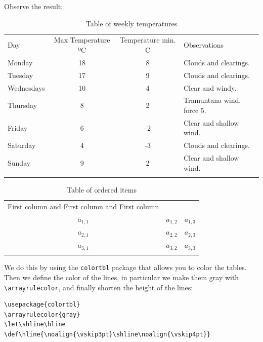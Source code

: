 \documentclass[a4paper,
                             twoside,
                             BCOR=1.0cm,
                             DIV=11,
                             parskip=full,
                             11pt]{scrbook}
\let\shline\hline
\def\hline{\noalign{\vskip3pt}\shline\noalign{\vskip4pt}}
\begin{document}
Observe the result:

\begin{table}[h]
    \centering
    \begin{tabular}{l|c|c|l}
        \hline
        Day        & Max Temperature ºC & Temperature min. C & Observations              \\
        \hline
        Monday     & 18                 & 8                  & Clouds and clearings.     \\
        Tuesday    & 17                 & 9                  & Clouds and clearings.     \\
        Wednesdays & 10                 & 4                  & Clear and windy.          \\
        Thursday   & 8                  & 2                  & Tramuntana wind, force 5. \\
        Friday     & 6                  & -2                 & Clear and shallow wind.   \\
        Saturday   & 4                  & -3                 & Clouds and clearings.     \\
        Sunday     & 9                  & 2                  & Clear and shallow wind.   \\
        \hline
    \end{tabular}
    \caption{Table of weekly temperatures}\label{tab:temp}
\end{table}

\begin{table}[h]
    \centering
    \begin{tabular}{c|c|c}
        \hline
        First column and First column and First column \\
        \hline
        $a_{1,1}$ & $a_{1,2}$ & $a_{1,3}$              \\
        $a_{2,1}$ & $a_{2,2}$ & $a_{2,3}$              \\
        $a_{3,1}$ & $a_{3,2}$ & $a_{3,3}$              \\
        \hline
    \end{tabular}
    \caption{Table of ordered items}\label{tab:ordre}
\end{table}

We do this by using the \verb+colortbl+ package that allows you to color the tables. Then we define the color of the lines, in particular we make them gray with \verb+\arrayrulecolor+, and finally shorten the height of the lines:

\begin{verbatim}
\usepackage{colortbl}
\arrayrulecolor{gray}
\let\shline\hline
\def\hline{\noalign{\vskip3pt}\shline\noalign{\vskip4pt}}
\end{verbatim}
\end{document}
